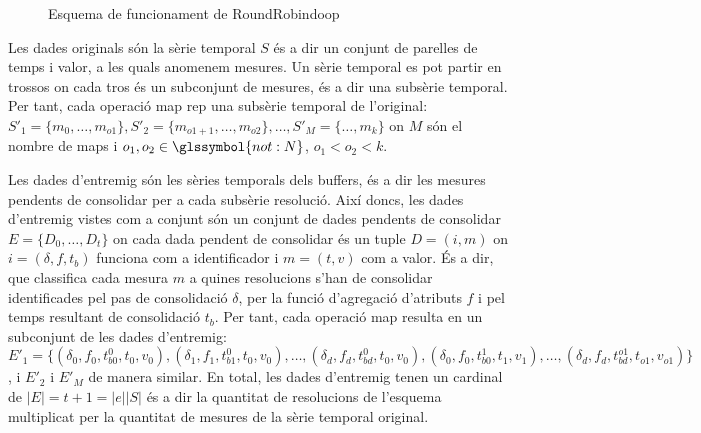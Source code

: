 \begin{figure}[tp]
  
  \caption{Esquema de funcionament de RoundRobindoop}
  \label{fig:roundrobindoop:esquema}
\end{figure}






Les dades originals són la sèrie temporal $S$ és a dir un conjunt de
parelles de temps i valor, a les quals anomenem mesures. Un sèrie
temporal es pot partir en trossos on cada tros és un subconjunt de
mesures, és a dir una subsèrie temporal. Per tant, cada operació map
rep una subsèrie temporal de l'original: $S'_1 =
\{m_0,\dotsc,m_{o1}\}, S'_2 = \{m_{o1+1},\dotsc,m_{o2}\}, \dotsc, S'_M
= \{\dotsc,m_{k}\}$ on $M$ són el nombre de maps i $o_1,o_2\in
\glssymbol{not:N}$, $o_1 < o_2 < k$.



Les dades d'entremig són les sèries temporals dels buffers, és a dir
les mesures pendents de consolidar per a cada subsèrie resolució.
Així doncs, les dades d'entremig vistes com a conjunt són un conjunt
de dades pendents de consolidar $E=\{ D_{0}, \dotsc, D_t\}$ on cada
dada pendent de consolidar és un tuple $D=(i,m)$ on $i=(\delta,f,t_b)$
funciona com a identificador i $m=(t,v)$ com a valor.  És a dir, que
classifica cada mesura $m$ a quines resolucions s'han de consolidar
identificades pel pas de consolidació $\delta$, per la funció
d'agregació d'atributs $f$ i pel temps resultant de consolidació
$t_b$. Per tant, cada operació map resulta en un subconjunt de les
dades d'entremig: $E'_1=\{ (\delta_0,f_0, t_{b0}^0, t_0,v_0),
(\delta_1,f_1, t_{b1}^0, t_0,v_0), \dotsc , (\delta_d,f_d, t_{bd}^0,
t_0,v_0), (\delta_0,f_0, t_{b0}^1, t_1,v_1), \dotsc, (\delta_d,f_d,
t_{bd}^{o1}, t_{o1},v_{o1}) \}$, i $E'_2$ i $E'_M$ de manera similar.
En total, les dades d'entremig tenen un cardinal de $|E|=t+1=|e||S|$
és a dir la quantitat de resolucions de l'esquema multiplicat per la
quantitat de mesures de la sèrie temporal original.


